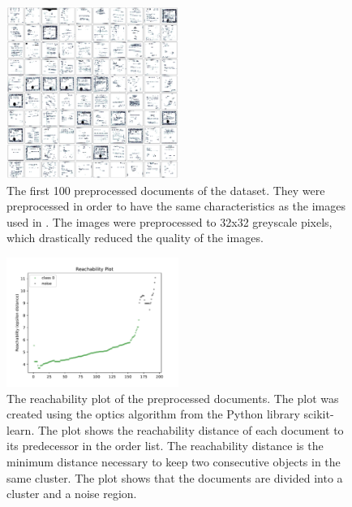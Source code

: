 \begin{figure}[htp] %
    \centering
    \includegraphics[width=0.5\textwidth]{images/preprocessed_docs.pdf}
    \caption{The first 100 preprocessed documents of the dataset.
    They were preprocessed in order to have the same characteristics as the images used in \cite{OPTICS1999}.
    The images were preprocessed to 32x32 greyscale pixels, which drastically reduced the quality of the images.
    }
    \label{fig:preprocessed_docs}
\end{figure}


\begin{figure}[htp] %
    \centering
    \includegraphics[width=0.5\textwidth]{images/reachability_plot.pdf}
    \caption{The reachability plot of the preprocessed documents.
    The plot was created using the \ac{optics} algorithm from the Python library scikit-learn.
    The plot shows the reachability distance of each document to its predecessor in the order list.
    The reachability distance is the minimum distance necessary to keep two consecutive objects in the same cluster.
    The plot shows that the documents are divided into a cluster and a noise region.
    }
    \label{fig:reachability_plot}
\end{figure}


